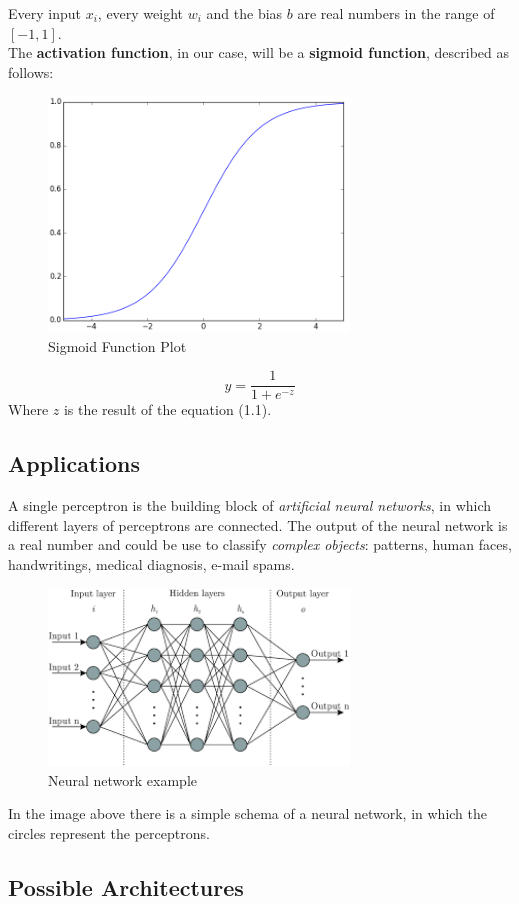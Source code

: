 Every input $x_{i}$, every weight $w_{i}$ and the bias $b$ are real numbers in the range of $[-1, 1]$. \\
The \textbf{activation function}, in our case, will be a \textbf{sigmoid function}, described as follows:
\begin{figure}[h]
	\centering
	\caption{Sigmoid Function Plot}
	\includegraphics[width=8cm]{img/sigmoid.png}
\end{figure}
\begin{equation}
	y = \dfrac{1}{1+e^{-z}}
\end{equation}
Where $z$ is the result of the equation (1.1).
\subsection{Applications}
A single perceptron is the building block of \textit{artificial neural networks}, in which different layers of perceptrons are connected. The output of the neural network is a real number and could be use to classify \textit{complex objects}: patterns, human faces, handwritings, medical diagnosis, e-mail spams.\\
\begin{figure}[H]
	\centering
	\caption{Neural network example}
	\includegraphics[width=8cm]{img/neural_network.png}
\end{figure}
In the image above there is a simple schema of a neural network, in which the circles represent the perceptrons.
\subsection{Possible Architectures}

